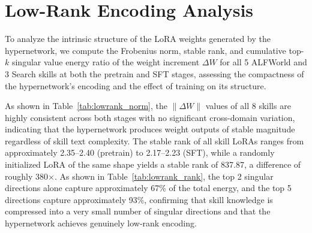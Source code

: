 \documentclass{llmxive}
\begin{document}
\section{Low-Rank Encoding Analysis}
\label{app:lowrank}
 
To analyze the intrinsic structure of the LoRA weights generated by the hypernetwork, we compute the Frobenius norm, stable rank, and cumulative top-$k$ singular value energy ratio of the weight increment $\Delta W$ for all 5 ALFWorld and 3 Search skills at both the pretrain and SFT stages, assessing the compactness of the hypernetwork's encoding and the effect of training on its structure.
 
As shown in Table~\ref{tab:lowrank_norm}, the $\|\Delta W\|$ values of all 8 skills are highly consistent across both stages with no significant cross-domain variation, indicating that the hypernetwork produces weight outputs of stable magnitude regardless of skill text complexity. The stable rank of all skill LoRAs ranges from approximately 2.35--2.40 (pretrain) to 2.17--2.23 (SFT), while a randomly initialized LoRA of the same shape yields a stable rank of 837.87, a difference of roughly 380$\times$. As shown in Table~\ref{tab:lowrank_rank}, the top 2 singular directions alone capture approximately 67\% of the total energy, and the top 5 directions capture approximately 93\%, confirming that skill knowledge is compressed into a very small number of singular directions and that the hypernetwork achieves genuinely low-rank encoding.
 
\end{document}
